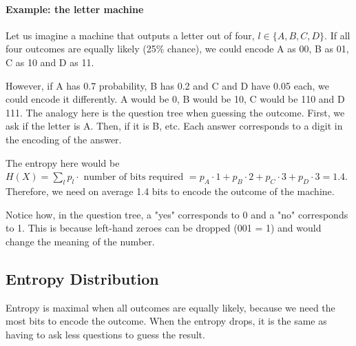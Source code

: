 \documentclass[10pt,a4paper]{book}
\begin{document}
\paragraph{Example: the letter machine}
Let us imagine a machine that outputs a letter out of four, $l\in\{A,B,C,D\}$. If all four outcomes are equally likely (25\% chance), we could encode A as 00, B as 01, C as 10 and D as 11.\par 
However, if A has 0.7 probability, B has 0.2 and C and D have 0.05 each, we could encode it differently. A would be 0, B would be 10, C would be 110 and D 111. The analogy here is the question tree when guessing the outcome. First, we ask if the letter is A. Then, if it is B, etc. Each answer corresponds to a digit in the encoding of the answer.\par 
The entropy here would be $H(X)=\sum_{l}p_l\cdot\text{ number of bits required }=p_A\cdot 1+p_B\cdot 2+p_C\cdot 3+p_D\cdot 3=1.4$. Therefore, we need on average 1.4 bits to encode the outcome of the machine.\par 
Notice how, in the question tree, a "yes" corresponds to 0 and a "no" corresponds to 1. This is because left-hand zeroes can be dropped (001 = 1) and would change the meaning of the number.

\subsection{Entropy Distribution}
Entropy is maximal when all outcomes are equally likely, because we need the most bits to encode the outcome. When the entropy drops, it is the same as having to ask less questions to guess the result.
\end{document}
